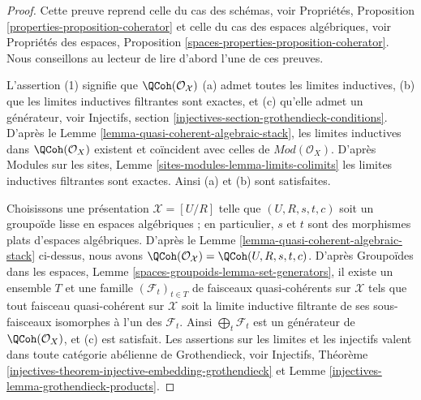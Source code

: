 \begin{proof}
Cette preuve reprend celle du cas des schémas, voir
Propriétés, Proposition \ref{properties-proposition-coherator}
et celle du cas des espaces algébriques, voir
Propriétés des espaces, Proposition
\ref{spaces-properties-proposition-coherator}.
Nous conseillons au lecteur de lire d'abord l'une de ces preuves.

\medskip\noindent
L'assertion (1) signifie que $\QCoh(\mathcal{O}_\mathcal{X})$ (a) admet toutes les limites inductives,
(b) que les limites inductives filtrantes sont exactes, et (c) qu'elle admet un générateur, voir
Injectifs, section \ref{injectives-section-grothendieck-conditions}.
D'après le Lemme \ref{lemma-quasi-coherent-algebraic-stack},
les limites inductives dans $\QCoh(\mathcal{O}_X)$ existent et coïncident
avec celles de $\textit{Mod}(\mathcal{O}_X)$. D'après
Modules sur les sites, Lemme \ref{sites-modules-lemma-limits-colimits}
les limites inductives filtrantes sont exactes. Ainsi (a) et (b) sont satisfaites.

\medskip\noindent
Choisissons une présentation $\mathcal{X} = [U/R]$ telle que $(U, R, s, t, c)$
soit un groupoïde lisse en espaces algébriques ; en particulier, $s$ et $t$
sont des morphismes plats d'espaces algébriques. D'après le
Lemme \ref{lemma-quasi-coherent-algebraic-stack}
ci-dessus, nous avons
$\QCoh(\mathcal{O}_\mathcal{X}) = \QCoh(U, R, s, t, c)$.
D'après Groupoïdes dans les espaces, Lemme \ref{spaces-groupoids-lemma-set-generators},
il existe un ensemble $T$ et une famille $(\mathcal{F}_t)_{t \in T}$ de
faisceaux quasi-cohérents sur $\mathcal{X}$ tels que tout faisceau quasi-cohérent
sur $\mathcal{X}$ soit la limite inductive filtrante de ses sous-faisceaux
isomorphes à l'un des $\mathcal{F}_t$.
Ainsi $\bigoplus_t \mathcal{F}_t$ est
un générateur de $\QCoh(\mathcal{O}_X)$, et (c) est satisfait.
Les assertions sur les limites et les injectifs valent dans toute
catégorie abélienne de Grothendieck, voir
Injectifs, Théorème
\ref{injectives-theorem-injective-embedding-grothendieck} et
Lemme \ref{injectives-lemma-grothendieck-products}.


\end{proof}

